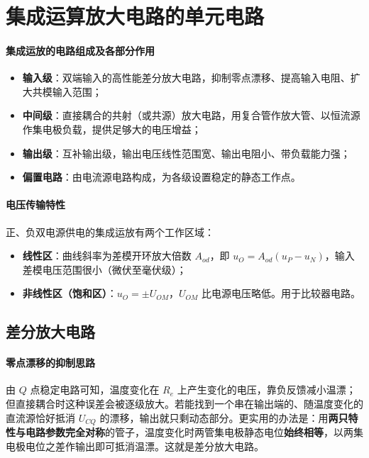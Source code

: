 \section{集成运算放大电路的单元电路}

\paragraph{集成运放的电路组成及各部分作用}
\begin{itemize}
    \item \textbf{输入级}：双端输入的高性能差分放大电路，抑制零点漂移、提高输入电阻、扩大共模输入范围；
    \item \textbf{中间级}：直接耦合的共射（或共源）放大电路，用复合管作放大管、以恒流源作集电极负载，提供足够大的电压增益；
    \item \textbf{输出级}：互补输出级，输出电压线性范围宽、输出电阻小、带负载能力强；
    \item \textbf{偏置电路}：由电流源电路构成，为各级设置稳定的静态工作点。
\end{itemize}

\paragraph{电压传输特性}
正、负双电源供电的集成运放有两个工作区域：
\begin{itemize}
    \item \textbf{线性区}：曲线斜率为差模开环放大倍数 $A_{od}$，即 $u_O=A_{od}(u_P-u_N)$，输入差模电压范围很小（微伏至毫伏级）；
    \item \textbf{非线性区（饱和区）}：$u_O=\pm U_{OM}$，$U_{OM}$ 比电源电压略低。用于比较器电路。
\end{itemize}

\subsection{差分放大电路}

\paragraph{零点漂移的抑制思路}
由 $Q$ 点稳定电路可知，温度变化在 $R_e$ 上产生变化的电压，靠负反馈减小温漂；但直接耦合时这种误差会被逐级放大。若能找到一个串在输出端的、随温度变化的直流源恰好抵消 $U_{CQ}$ 的漂移，输出就只剩动态部分。更实用的办法是：用\textbf{两只特性与电路参数完全对称}的管子，温度变化时两管集电极静态电位\textbf{始终相等}，以两集电极电位之差作输出即可抵消温漂。这就是差分放大电路。

